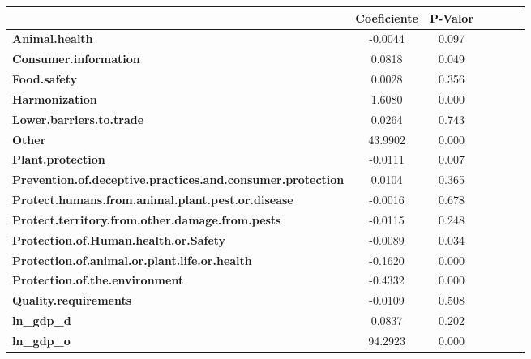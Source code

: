\begin{table}[ht]
\begin{center}
        
        \begin{tabular}{lcccccc}
            & \textbf{Coeficiente} &\textbf{P-Valor}\\
\midrule
\textbf{Animal.health}                                             &      -0.0044 &        0.097       \\
\textbf{Consumer.information}                                      &       0.0818 &        0.049       \\
\textbf{Food.safety}                                               &       0.0028 &        0.356       \\
\textbf{Harmonization}                                             &       1.6080 &        0.000       \\
\textbf{Lower.barriers.to.trade}                                   &       0.0264 &        0.743       \\
\textbf{Other}                                                     &      43.9902 &        0.000       \\
\textbf{Plant.protection}                                          &      -0.0111 &        0.007       \\
\textbf{Prevention.of.deceptive.practices.and.consumer.protection} &       0.0104 &        0.365       \\
\textbf{Protect.humans.from.animal.plant.pest.or.disease}          &      -0.0016 &        0.678       \\
\textbf{Protect.territory.from.other.damage.from.pests}            &      -0.0115 &        0.248       \\
\textbf{Protection.of.Human.health.or.Safety}                      &      -0.0089 &        0.034       \\
\textbf{Protection.of.animal.or.plant.life.or.health}              &      -0.1620 &        0.000       \\
\textbf{Protection.of.the.environment}                             &      -0.4332 &        0.000       \\
\textbf{Quality.requirements}                                      &      -0.0109 &        0.508       \\
\textbf{ln\_gdp\_d}                                                &       0.0837 &        0.202       \\
\textbf{ln\_gdp\_o}                                                &      94.2923 &        0.000       \\

\end{tabular}
\end{center}
\end{table}
